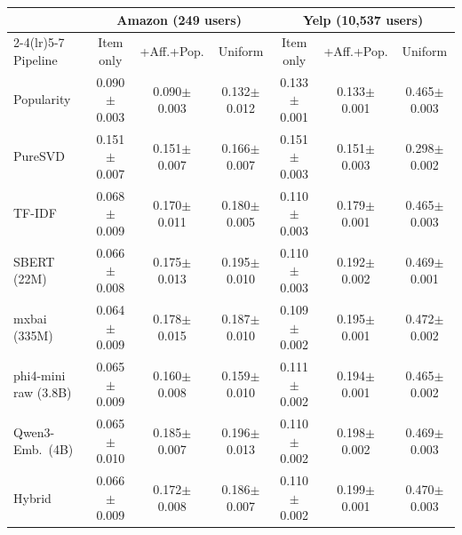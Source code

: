 \begin{tabular}{lcccccc}
\toprule
 & \multicolumn{3}{c}{Amazon (249 users)} & \multicolumn{3}{c}{Yelp (10,537 users)} \\
\cmidrule(lr){2-4}\cmidrule(lr){5-7}
Pipeline & Item only & +Aff.+Pop. & Uniform & Item only & +Aff.+Pop. & Uniform \\
\midrule
Popularity & 0.090$\pm$0.003 & 0.090$\pm$0.003 & 0.132$\pm$0.012 & 0.133$\pm$0.001 & 0.133$\pm$0.001 & 0.465$\pm$0.003 \\
PureSVD & 0.151$\pm$0.007 & 0.151$\pm$0.007 & 0.166$\pm$0.007 & 0.151$\pm$0.003 & 0.151$\pm$0.003 & 0.298$\pm$0.002 \\
\midrule
TF-IDF & 0.068$\pm$0.009 & 0.170$\pm$0.011 & 0.180$\pm$0.005 & 0.110$\pm$0.003 & 0.179$\pm$0.001 & 0.465$\pm$0.003 \\
SBERT (22M) & 0.066$\pm$0.008 & 0.175$\pm$0.013 & 0.195$\pm$0.010 & 0.110$\pm$0.003 & 0.192$\pm$0.002 & 0.469$\pm$0.001 \\
mxbai (335M) & 0.064$\pm$0.009 & 0.178$\pm$0.015 & 0.187$\pm$0.010 & 0.109$\pm$0.002 & 0.195$\pm$0.001 & 0.472$\pm$0.002 \\
phi4-mini raw (3.8B) & 0.065$\pm$0.009 & 0.160$\pm$0.008 & 0.159$\pm$0.010 & 0.111$\pm$0.002 & 0.194$\pm$0.001 & 0.465$\pm$0.002 \\
Qwen3-Emb.\ (4B) & 0.065$\pm$0.010 & 0.185$\pm$0.007 & 0.196$\pm$0.013 & 0.110$\pm$0.002 & 0.198$\pm$0.002 & 0.469$\pm$0.003 \\
Hybrid & 0.066$\pm$0.009 & 0.172$\pm$0.008 & 0.186$\pm$0.007 & 0.110$\pm$0.002 & 0.199$\pm$0.001 & 0.470$\pm$0.003 \\
\bottomrule
\end{tabular}
